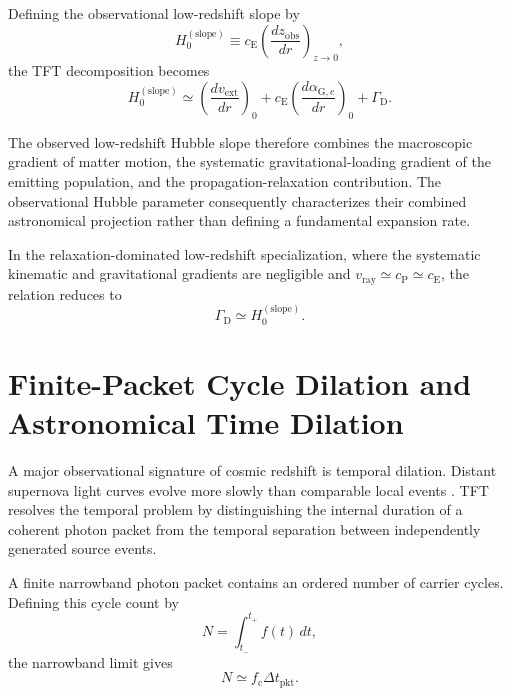 Defining the observational low-redshift slope by
\begin{equation}
    H_0^{(\mathrm{slope})}
    \equiv
    c_{\mathrm E}
    \left(
        \frac{dz_{\mathrm{obs}}}{dr}
    \right)_{z\rightarrow0},
\end{equation}
the TFT decomposition becomes
\begin{equation}
    H_0^{(\mathrm{slope})}
    \simeq
    \left(
        \frac{dv_{\mathrm{ext}}}{dr}
    \right)_0
    +
    c_{\mathrm E}
    \left(
        \frac{d\alpha_{\mathrm G,e}}{dr}
    \right)_0
    +
    \Gamma_{\mathrm D}.
\end{equation}

The observed low-redshift Hubble slope therefore combines the macroscopic gradient of matter motion, the systematic gravitational-loading gradient of the emitting population, and the propagation-relaxation contribution. The observational Hubble parameter consequently characterizes their combined astronomical projection rather than defining a fundamental expansion rate.

In the relaxation-dominated low-redshift specialization, where the systematic kinematic and gravitational gradients are negligible and
$v_{\mathrm{ray}}\simeq c_{\mathrm P}\simeq c_{\mathrm E}$,
the relation reduces to
\begin{equation}
    \Gamma_{\mathrm D}
    \simeq
    H_0^{(\mathrm{slope})}.
\end{equation}


\section{Finite-Packet Cycle Dilation and Astronomical Time Dilation}

A major observational signature of cosmic redshift is temporal dilation. Distant supernova light curves evolve more slowly than comparable local events \cite{Goldhaber_2001}. TFT resolves the temporal problem by distinguishing the internal duration of a coherent photon packet from the temporal separation between independently generated source events.

A finite narrowband photon packet contains an ordered number of carrier cycles. Defining this cycle count by
\begin{equation}
    N
    =
    \int_{t_-}^{t_+}
    f(t)\,dt,
\end{equation}
the narrowband limit gives
\begin{equation}
    N
    \simeq
    f_{\mathrm c}
    \Delta t_{\mathrm{pkt}}.
\end{equation}

